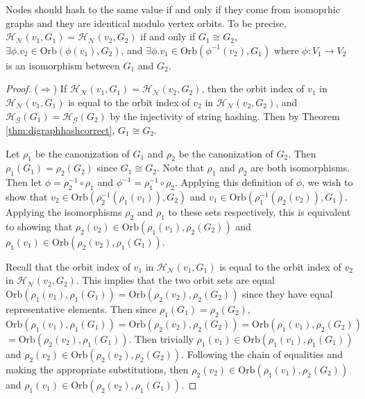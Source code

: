 \documentclass[twoside,leqno]{article}
\begin{document}
\begin{theorem}
\label{thm:digraphnodehashcorrect}
Nodes should hash to the same value if and only if they come from isomoprhic graphs and they are identical modulo vertex orbits. To be precise, $\mathcal{H_N}(v_1, G_1)=\mathcal{H_N}(v_2, G_2)$ if and only if $G_1 \cong G_2$, $\exists \phi . v_2 \in \text{Orb}(\phi(v_1), G_2)$, and $\exists \phi . v_1 \in \text{Orb}(\phi^{-1}(v_2), G_1)$ where $\phi : V_1 \rightarrow V_2$ is an isomorphism between $G_1$ and $G_2$.
\end{theorem}

\begin{proof}
($\Rightarrow$) If $\mathcal{H_N}(v_1, G_1)=\mathcal{H_N}(v_2, G_2)$, then the orbit index of $v_1$ in $\mathcal{H_N}(v_1, G_1)$ is equal to the orbit index of $v_2$ in $\mathcal{H_N}(v_2, G_2)$, and $\mathcal{H_G}(G_1)=\mathcal{H_G}(G_2)$ by the injectivity of string hashing. Then by Theorem \ref{thm:digraphhashcorrect}, $G_1 \cong G_2$.

Let $\rho_1$ be the canonization of $G_1$ and $\rho_2$ be the canonization of $G_2$. Then $\rho_1(G_1)=\rho_2(G_2)$ since $G_1 \cong G_2$. Note that $\rho_1$ and $\rho_2$ are both isomorphisms. Then let $\phi=\rho_2^{-1} \circ \rho_1$ and $\phi^{-1}=\rho_1^{-1} \circ \rho_2$. Applying this definition of $\phi$, we wish to show that $v_2 \in \text{Orb}(\rho_2^{-1}(\rho_1 (v_1)), G_2)$ and $v_1 \in \text{Orb}(\rho_1^{-1}(\rho_2 (v_2)), G_1)$. Applying the isomorphisms $\rho_2$ and $\rho_1$ to these sets respectively, this is equivalent to showing that $\rho_2(v_2) \in \text{Orb}(\rho_1 (v_1), \rho_2(G_2))$ and $\rho_1(v_1) \in \text{Orb}(\rho_2 (v_2), \rho_1(G_1))$.

Recall that the orbit index of $v_1$ in $\mathcal{H_N}(v_1, G_1)$ is equal to the orbit index of $v_2$ in $\mathcal{H_N}(v_2, G_2)$. This implies that the two orbit sets are equal $\text{Orb}(\rho_1 (v_1), \rho_1(G_1))=\text{Orb}(\rho_2 (v_2), \rho_2(G_2))$ since they have equal representative elements. Then since $\rho_1(G_1)=\rho_2(G_2)$, $\text{Orb}(\rho_1 (v_1), \rho_1(G_1))=\text{Orb}(\rho_2 (v_2), \rho_2(G_2))=\text{Orb}(\rho_1 (v_1), \rho_2(G_2))$\\
$=\text{Orb}(\rho_2 (v_2), \rho_1(G_1))$. Then trivially $\rho_1(v_1) \in \text{Orb}(\rho_1 (v_1), \rho_1(G_1))$ and $\rho_2(v_2) \in \text{Orb}(\rho_2 (v_2), \rho_2(G_2))$. Following the chain of equalities and making the appropriate substitutions, then $\rho_2(v_2) \in \text{Orb}(\rho_1 (v_1), \rho_2(G_2))$ and $\rho_1(v_1) \in \text{Orb}(\rho_2 (v_2), \rho_1(G_1))$.


\end{proof}
\end{document}

